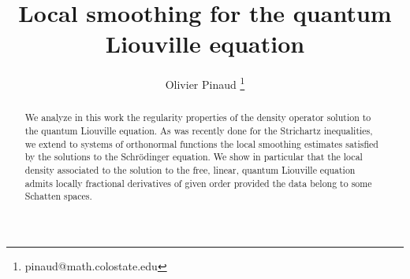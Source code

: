 \documentclass[12pt]{article}
\begin{document}
{\title{Local smoothing for the quantum Liouville equation}}


 \author{Olivier Pinaud \footnote{pinaud@math.colostate.edu}}
 

\maketitle

\begin{abstract}
 We analyze in this work the regularity properties of the density operator solution to the quantum Liouville equation. As was recently done for the Strichartz inequalities, we extend to systems of orthonormal functions the local smoothing estimates satisfied by the solutions to the Schr\"odinger equation. We show in particular that the local density associated to the solution to the free, linear, quantum Liouville equation admits locally fractional derivatives of given order provided the data belong to some Schatten spaces.
\end{abstract}
\end{document}
